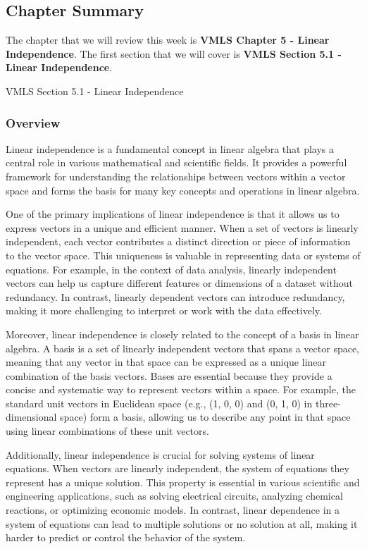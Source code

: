 \subsection{Chapter Summary}

The chapter that we will review this week is \textbf{VMLS Chapter 5 - Linear Independence}. The first section that we will cover is \textbf{VMLS Section 5.1 - Linear Independence}.

\begin{notes}{VMLS Section 5.1 - Linear Independence}
    \subsubsection*{Overview}

    Linear independence is a fundamental concept in linear algebra that plays a central role in various mathematical and scientific fields. It provides a powerful framework for understanding the 
    relationships between vectors within a vector space and forms the basis for many key concepts and operations in linear algebra.

    One of the primary implications of linear independence is that it allows us to express vectors in a unique and efficient manner. When a set of vectors is linearly independent, each vector 
    contributes a distinct direction or piece of information to the vector space. This uniqueness is valuable in representing data or systems of equations. For example, in the context of data analysis, 
    linearly independent vectors can help us capture different features or dimensions of a dataset without redundancy. In contrast, linearly dependent vectors can introduce redundancy, making it more 
    challenging to interpret or work with the data effectively.
    
    Moreover, linear independence is closely related to the concept of a basis in linear algebra. A basis is a set of linearly independent vectors that spans a vector space, meaning that any vector 
    in that space can be expressed as a unique linear combination of the basis vectors. Bases are essential because they provide a concise and systematic way to represent vectors within a space. For 
    example, the standard unit vectors in Euclidean space (e.g., (1, 0, 0) and (0, 1, 0) in three-dimensional space) form a basis, allowing us to describe any point in that space using linear 
    combinations of these unit vectors.
    
    Additionally, linear independence is crucial for solving systems of linear equations. When vectors are linearly independent, the system of equations they represent has a unique solution. This 
    property is essential in various scientific and engineering applications, such as solving electrical circuits, analyzing chemical reactions, or optimizing economic models. In contrast, linear 
    dependence in a system of equations can lead to multiple solutions or no solution at all, making it harder to predict or control the behavior of the system.
    

\end{notes}
